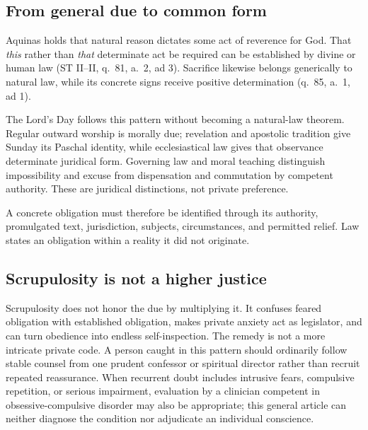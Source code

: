 \subsection{From general due to common form}

Aquinas holds that natural reason dictates some act of reverence for God. That \emph{this} rather than \emph{that} determinate act be required can be established by divine or human law (ST II--II, q.~81, a.~2, ad 3). Sacrifice likewise belongs generically to natural law, while its concrete signs receive positive determination (q.~85, a.~1, ad 1).

The Lord's Day follows this pattern without becoming a natural-law theorem. Regular outward worship is morally due; revelation and apostolic tradition give Sunday its Paschal identity, while ecclesiastical law gives that observance determinate juridical form. Governing law and moral teaching distinguish impossibility and excuse from dispensation and commutation by competent authority. These are juridical distinctions, not private preference.

A concrete obligation must therefore be identified through its authority, promulgated text, jurisdiction, subjects, circumstances, and permitted relief. Law states an obligation within a reality it did not originate.

\subsection{Scrupulosity is not a higher justice}

Scrupulosity does not honor the due by multiplying it. It confuses feared obligation with established obligation, makes private anxiety act as legislator, and can turn obedience into endless self-inspection. The remedy is not a more intricate private code. A person caught in this pattern should ordinarily follow stable counsel from one prudent confessor or spiritual director rather than recruit repeated reassurance. When recurrent doubt includes intrusive fears, compulsive repetition, or serious impairment, evaluation by a clinician competent in obsessive-compulsive disorder may also be appropriate; this general article can neither diagnose the condition nor adjudicate an individual conscience.
